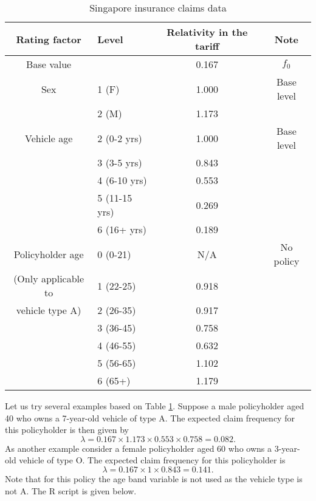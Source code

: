 \documentclass[12pt]{article}
\begin{document}
\begin{table}[htp]
\caption{Singapore insurance claims data}
\begin{center}
\begin{tabular}{clcc}
\hline
Rating factor & Level & Relativity in the tariff & Note\\ \hline\hline
Base value  &  & 0.167 & $f_0$\\ \hline
Sex & 1 (F) & 1.000 & Base level\\
 & 2 (M) & 1.173 \\\hline
 Vehicle age & 2 (0-2 yrs) & 1.000 & Base level\\
  & 3 (3-5 yrs) & 0.843 \\
  & 4 (6-10 yrs) & 0.553 \\
  & 5 (11-15 yrs) & 0.269 \\
  & 6 (16+ yrs) & 0.189\\\hline
  Policyholder age & 0 (0-21) & N/A & No policy \\
  (Only applicable to & 1 (22-25) & 0.918 \\
 vehicle type A)  & 2 (26-35) & 0.917 \\
  & 3 (36-45) & 0.758 \\
  & 4 (46-55) & 0.632 \\
  & 5 (56-65) &  1.102\\
  & 6 (65+) & 1.179\\ \hline \hline
\end{tabular}
\end{center}
\label{tab.eg2}
\end{table}%
Let us try several examples based on Table \ref{tab.eg2}. Suppose a male policyholder aged 40 who owns a 7-year-old vehicle of type A. The expected claim frequency for this policyholder is then given by 
\begin{equation}
\label{ }\nonumber
\lambda=0.167 \times 1.173 \times 0.553 \times 0.758 = 0.082.
\end{equation} As another example consider a female  policyholder aged 60 who owns a 3-year-old vehicle of type O. The expected claim frequency for this policyholder is
\begin{equation}
\label{ }\nonumber
\lambda=0.167 \times 1 \times 0.843  = 0.141.
\end{equation}
Note that for this policy the age band variable is not used as the vehicle type is not A. The R script is given below.
\end{document}
